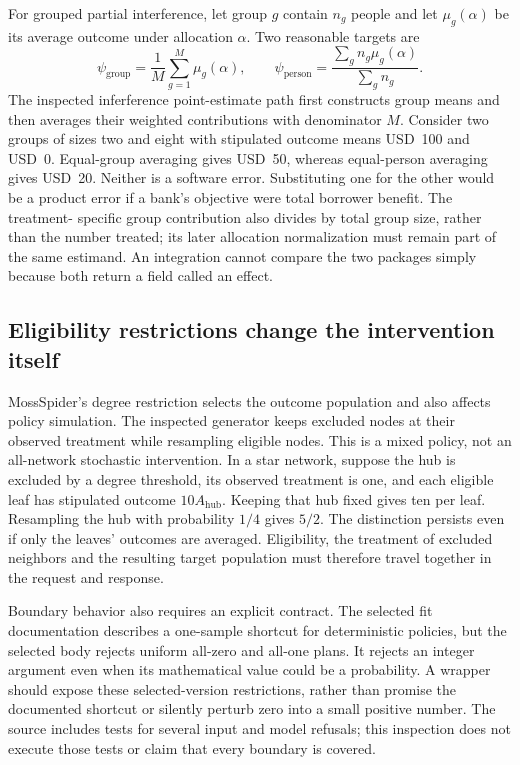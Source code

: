 For grouped partial interference, let group $g$ contain $n_g$ people and let
$\mu_g(\alpha)$ be its average outcome under allocation $\alpha$. Two
reasonable targets are
\[
 \psi_{\mathrm{group}}=\frac1M\sum_{g=1}^M\mu_g(\alpha),
 \qquad
 \psi_{\mathrm{person}}=\frac{\sum_g n_g\mu_g(\alpha)}{\sum_g n_g}.
\]
The inspected inferference point-estimate path first constructs group means
and then averages their weighted contributions with denominator $M$. Consider
two groups of sizes two and eight with stipulated outcome means USD~100 and
USD~0. Equal-group averaging gives USD~50, whereas equal-person averaging gives
USD~20. Neither is a software error. Substituting one for the other would be a
product error if a bank's objective were total borrower benefit. The treatment-
specific group contribution also divides by total group size, rather than the
number treated; its later allocation normalization must remain part of the
same estimand. An integration cannot compare the two packages simply because
both return a field called an effect.
\citep{exec24_interference_inferference,exec24_interference_reference}

\subsection{Eligibility restrictions change the intervention itself}
MossSpider's degree restriction selects the outcome population and also affects
policy simulation. The inspected generator keeps excluded nodes at their
observed treatment while resampling eligible nodes. This is a mixed policy,
not an all-network stochastic intervention. In a star network, suppose the hub
is excluded by a degree threshold, its observed treatment is one, and each
eligible leaf has stipulated outcome $10A_{\mathrm{hub}}$. Keeping that hub
fixed gives ten per leaf. Resampling the hub with probability $1/4$ gives
$5/2$. The distinction persists even if only the leaves' outcomes are averaged.
Eligibility, the treatment of excluded neighbors and the resulting target
population must therefore travel together in the request and response.
\citep{exec24_interference_mossspider,exec24_interference_reference}

Boundary behavior also requires an explicit contract. The selected fit
documentation describes a one-sample shortcut for deterministic policies, but
the selected body rejects uniform all-zero and all-one plans. It rejects an
integer argument even when its mathematical value could be a probability. A
wrapper should expose these selected-version restrictions, rather than promise
the documented shortcut or silently perturb zero into a small positive number.
The source includes tests for several input and model refusals; this inspection
does not execute those tests or claim that every boundary is covered.
\citep{exec24_interference_mossspider}

